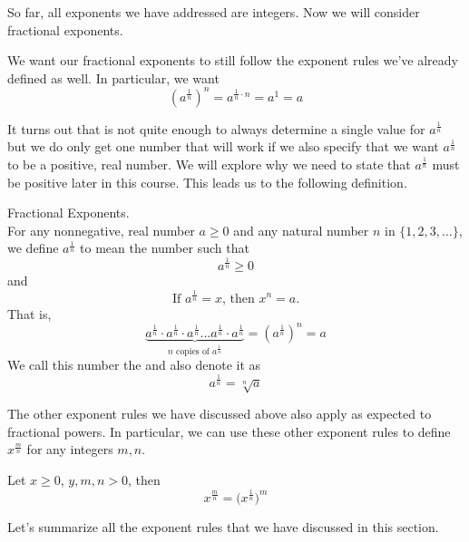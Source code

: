 \documentclass{ximera}
\begin{document}
    So far, all exponents we have addressed are integers. Now we will consider fractional exponents. 

We want our fractional exponents to still follow the exponent rules we've already defined as well.  In particular, we want
\[
\left(a^{\frac{1}{n}}\right)^n=a^{\frac{1}{n} \cdot {n}} = a^1 = a  
\]       

It turns out that is not quite enough to always determine a single value for $a^{\frac{1}{n}}$ but we do only get one number that will work if we also specify that we want  $a^{\frac{1}{n}}$ to be a positive, real number.  We will explore why we need to state that  $a^{\frac{1}{n}}$ must be positive later in this course.  This leads us to the following definition.

    \begin{definition}
    Fractional Exponents.\\
          For any nonnegative, real number $a \geq 0$ and any natural number $n$ in $\{1,2,3,\dots\}$,
          we define $a^{\frac{1}{n}}$ to mean the number such that
 $$a^{\frac{1}{n}} \geq 0$$
and
$$      
 \text{If } a^{\frac{1}{n}} = x \text{, then } x^n = a.
   $$
That is,
\[
\underbrace{a^{\frac{1}{n}} \cdot a^{\frac{1}{n}} \cdot a^{\frac{1}{n}} ... a^{\frac{1}{n}} \cdot a^{\frac{1}{n}}}_{\textrm{$n$ copies of $a^{\frac{1}{n}}$}} = \left(a^{\frac{1}{n}}\right)^n=a
\]
We call this number the  and also denote it as 
\[
a^{\frac{1}{n}} = \sqrt[n]{a}
\] 
    \end{definition}

  The other exponent rules we have discussed above also apply as expected to fractional powers. In particular, we can use these other exponent rules to define $x^{\frac{m}{n}}$ for any integers $m,n$.
  
  \begin{definition}
  Let $x\geq 0$, $y,m,n >0$, then
  $$x^{\frac{m}{n}} = \big(x^{\frac{1}{n}}\big)^m$$
 \end{definition}

Let's summarize all the exponent rules that we have discussed in this section.
\end{document}
